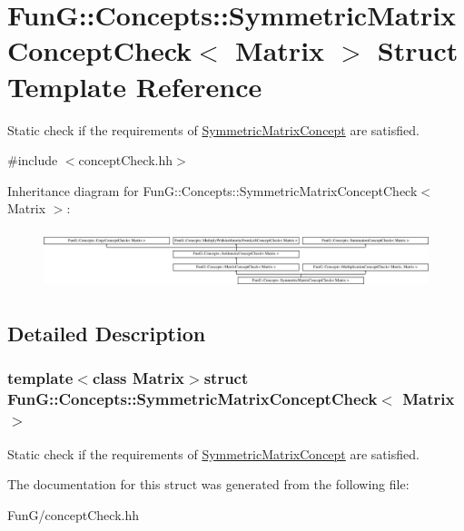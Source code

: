 \hypertarget{structFunG_1_1Concepts_1_1SymmetricMatrixConceptCheck}{\section{Fun\-G\-:\-:Concepts\-:\-:Symmetric\-Matrix\-Concept\-Check$<$ Matrix $>$ Struct Template Reference}
\label{structFunG_1_1Concepts_1_1SymmetricMatrixConceptCheck}
}


Static check if the requirements of \hyperlink{structFunG_1_1Concepts_1_1SymmetricMatrixConcept}{Symmetric\-Matrix\-Concept} are satisfied.  




{\ttfamily \#include $<$concept\-Check.\-hh$>$}

Inheritance diagram for Fun\-G\-:\-:Concepts\-:\-:Symmetric\-Matrix\-Concept\-Check$<$ Matrix $>$\-:\begin{figure}[H]
\begin{center}
\leavevmode
\includegraphics[height=1.728395cm]{structFunG_1_1Concepts_1_1SymmetricMatrixConceptCheck}
\end{center}
\end{figure}


\subsection{Detailed Description}
\subsubsection*{template$<$class Matrix$>$struct Fun\-G\-::\-Concepts\-::\-Symmetric\-Matrix\-Concept\-Check$<$ Matrix $>$}

Static check if the requirements of \hyperlink{structFunG_1_1Concepts_1_1SymmetricMatrixConcept}{Symmetric\-Matrix\-Concept} are satisfied. 

The documentation for this struct was generated from the following file\-:\begin{DoxyCompactItemize}
\item 
Fun\-G/concept\-Check.\-hh\end{DoxyCompactItemize}
